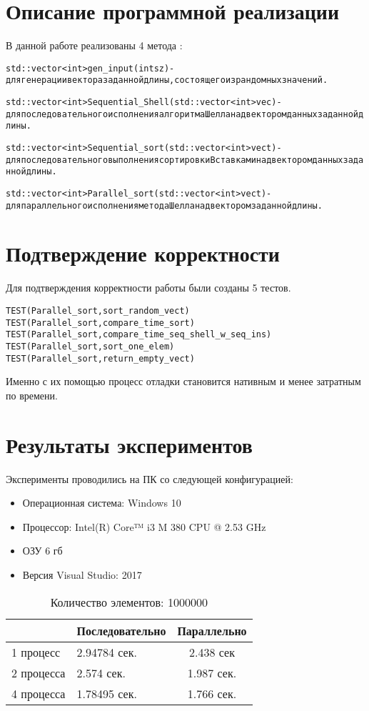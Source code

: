 \documentclass{report}
\begin{document}
\section*{Описание программной реализации}
В данной работе реализованы 4 метода :
\begin{alltt}
std::vector<int> gen_input(int sz) {} - для генерации вектора заданной  длины,состоящего из рандомных значений.

std::vector<int> Sequential_Shell(std::vector<int> vec) {} - для последовательного исполнения алгоритма Шелла над вектором данных  заданной длины.

std::vector<int> Sequential_sort(std::vector<int> vect) {} - для последовательного выполнения сортировки Вставками над вектором данных заданной длины.

std::vector<int> Parallel_sort(std::vector<int> vect) {} - для параллельного исполнения метода Шелла над вектором заданной длины.
\end{alltt}
\newpage
\section*{Подтверждение корректности}
Для подтверждения корректности работы были созданы 5 тестов.
\begin{alltt}
TEST(Parallel_sort, sort_random_vect) {}
TEST(Parallel_sort, compare_time_sort) {}
TEST(Parallel_sort, compare_time_seq_shell_w_seq_ins) {}
TEST(Parallel_sort, sort_one_elem) {}
TEST(Parallel_sort, return_empty_vect) {}
\end{alltt}
Именно с их помощью процесс отладки становится нативным и менее затратным по времени.
\newpage
\section*{Результаты экспериментов}
Эксперименты проводились на ПК со следующей конфигурацией:
\begin{itemize}
\item Операционная система: Windows 10
\item Процессор: Intel(R) Core™ i3 M 380 CPU @ 2.53 GHz
\item ОЗУ 6 гб
\item Версия Visual Studio: 2017
\end{itemize}
\begin{table}[h]
  \caption{Количество элементов: 1000000}
  \centering
\begin{tabular}{ || l | l | c || }
\hline
 & Последовательно  & Параллельно  \\ \hline
1 процесс & 2.94784 сек. & 2.438 сек \\ \hline
2 процесса & 2.574 сек. & 1.987 сек.  \\ \hline
4 процесса & 1.78495 сек. & 1.766 сек. \\
\hline
\end{tabular}
\label{table:performance}
\end{table}
\end{document}
